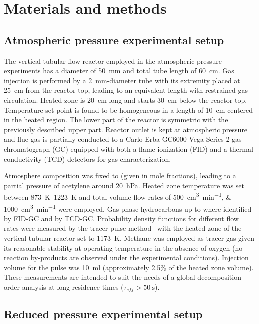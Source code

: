 \documentclass[final,3p,times,twocolumn,sort&compress]{elsarticle}
\begin{document}
\section{Materials and methods}

\subsection{\label{sec:mat-atmospheric-pressure}Atmospheric pressure experimental setup}

The vertical tubular flow reactor employed in the atmospheric pressure experiments has a diameter of \SI{50}{\milli\metre} and total tube length of \SI{60}{\centi\metre}. Gas injection is performed by a \SI{2}{\milli\metre}-diameter tube with its extremity placed at \SI{25}{\centi\metre} from the reactor top, leading to an equivalent length with restrained gas circulation. Heated zone is \SI{20}{\centi\metre} long and starts \SI{30}{\centi\metre} below the reactor top. Temperature set-point is found to be homogeneous in a length of \SI{10}{\centi\metre} centered in the heated region. The lower part of the reactor is symmetric with the previously described upper part. Reactor outlet is kept at atmospheric pressure and flue gas is partially conducted to a Carlo Erba GC6000 Vega Series 2 gas chromatograph (GC) equipped with both a flame-ionization (FID) and a thermal-conductivity (TCD) detectors for gas characterization.

Atmosphere composition was fixed to  (given in mole fractions), leading to a partial pressure of acetylene around \SI{20}{\hecto\pascal}. Heated zone temperature was set between \SIrange{873}{1223}{\kelvin} and total volume flow rates of \SIlist{500;1000}{\cubic\centi\metre\per\minute} were employed. Gas phase hydrocarbons up to  where identified by FID-GC and  by TCD-GC. Probability density functions for different flow rates were measured by the tracer pulse method~\cite{Fogler1999} with the heated zone of the vertical tubular reactor set to \SI{1173}{\kelvin}. Methane was employed as tracer gas given its reasonable stability at operating temperature in the absence of oxygen (no  reaction by-products are observed under the experimental conditions). Injection volume for the pulse was \SI{10}{\milli\litre} (approximately 2.5\% of the heated zone volume). These measurements are intended to suit the needs of a global decomposition order analysis at long residence times ($\tau_{eff}>\SI{50}{\second}$).

\subsection{Reduced pressure experimental setup}
\end{document}
